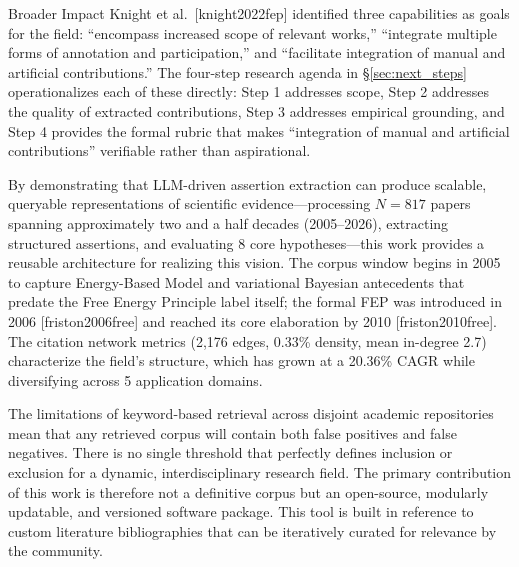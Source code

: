 \documentclass[
  ignorenonframetext,
]{beamer}
\providecommand{\citep}[1]{[#1]}
\begin{document}
\begin{frame}[allowframebreaks]{Broader Impact}
\protect{}\label{broader-impact}
Knight et al.~\citep{knight2022fep} identified three capabilities as
goals for the field: ``encompass increased scope of relevant works,''
``integrate multiple forms of annotation and participation,'' and
``facilitate integration of manual and artificial contributions.'' The
four-step research agenda in §\ref{sec:next_steps} operationalizes each
of these directly: Step 1 addresses scope, Step 2 addresses the quality
of extracted contributions, Step 3 addresses empirical grounding, and
Step 4 provides the formal rubric that makes ``integration of manual and
artificial contributions'' verifiable rather than aspirational.

By demonstrating that LLM-driven assertion extraction can produce
scalable, queryable representations of scientific evidence---processing
\(N = 817\) papers spanning approximately two and a half decades
(2005--2026), extracting structured assertions, and evaluating 8 core
hypotheses---this work provides a reusable architecture for realizing
this vision. The corpus window begins in 2005 to capture Energy-Based
Model and variational Bayesian antecedents that predate the Free Energy
Principle label itself; the formal FEP was introduced in 2006
\citep{friston2006free} and reached its core elaboration by 2010
\citep{friston2010free}. The citation network metrics (2,176 edges,
0.33\% density, mean in-degree 2.7) characterize the field's structure,
which has grown at a 20.36\% CAGR while diversifying across 5
application domains.

The limitations of keyword-based retrieval across disjoint academic
repositories mean that any retrieved corpus will contain both false
positives and false negatives. There is no single threshold that
perfectly defines inclusion or exclusion for a dynamic,
interdisciplinary research field. The primary contribution of this work
is therefore not a definitive corpus but an open-source, modularly
updatable, and versioned software package. This tool is built in
reference to custom literature bibliographies that can be iteratively
curated for relevance by the community.


\end{frame}
\end{document}

